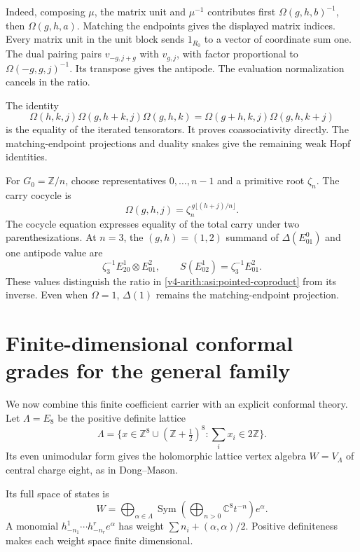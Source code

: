 Indeed, composing \(\mu\), the matrix unit and \(\mu^{-1}\)
contributes first \(\Omega(g,h,b)^{-1}\), then
\(\Omega(g,h,a)\). Matching the endpoints gives the displayed
matrix indices. Every matrix unit in the unit block sends
\(1_{R_0}\) to a vector of coordinate sum one.
The dual pairing pairs \(v_{-g,j+g}\) with \(v_{g,j}\), with
factor proportional to \(\Omega(-g,g,j)^{-1}\).
Its transpose gives the antipode. The evaluation normalization
cancels in the ratio.

The identity
\[
 \Omega(h,k,j)\Omega(g,h+k,j)\Omega(g,h,k)
 =\Omega(g+h,k,j)\Omega(g,h,k+j)
\]
is the equality of the iterated tensorators. It proves
coassociativity directly. The matching-endpoint projections and
duality snakes give the remaining weak Hopf identities.

For \(G_0=\mathbb Z/n\), choose representatives
\(0,\ldots,n-1\) and a primitive root \(\zeta_n\). The carry cocycle
is
\[
 \Omega(g,h,j)=\zeta_n^{\,g\lfloor(h+j)/n\rfloor}.
\]
The cocycle equation expresses equality of the total carry under
two parenthesizations. At \(n=3\), the \((g,h)=(1,2)\) summand of
\(\Delta(E^0_{01})\) and one antipode value are
\[
 \zeta_3^{-1}E^1_{20}\otimes E^2_{01},
 \qquad
 S(E^1_{02})=\zeta_3^{-1}E^2_{01}.
\]
These values distinguish the ratio in
\eqref{v4-arith:asi:pointed-coproduct} from its inverse.
Even when \(\Omega=1\), \(\Delta(1)\) remains the
matching-endpoint projection.

\section{Finite-dimensional conformal grades for the general family}
\label{v4-arith:asi:sec:finite-analytic}

We now combine this finite coefficient carrier with an explicit
conformal theory. Let $\Lambda=E_8$ be the positive definite lattice
\[
 \Lambda=\{x\in\mathbb Z^8\cup(\mathbb Z+\tfrac12)^8:
                                      \textstyle\sum_i x_i\in2\mathbb Z\}.
\]
Its even unimodular form gives the holomorphic lattice vertex
algebra \(W=V_\Lambda\) of central charge eight, as in Dong--Mason.

Its full space of states is
\[
 W=\bigoplus_{\alpha\in\Lambda}
 \operatorname{Sym}\left(\bigoplus_{n>0}\mathbb C^8t^{-n}\right)e^\alpha.
\]
A monomial $h^1_{-n_1}\cdots h^r_{-n_r}e^\alpha$ has weight
$\sum n_i+(\alpha,\alpha)/2$.
Positive definiteness makes each weight space finite dimensional.

